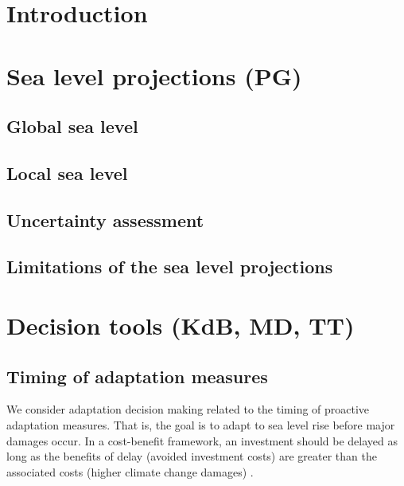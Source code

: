 \documentclass[wrr, draft]{agutex}
\begin{document}
\begin{article}



\section{Introduction}\label{sec:intro}

\section{Sea level projections {\color{blue} (PG)}}



\subsection{Global sea level}

\subsection{Local sea level}

\subsection{Uncertainty assessment}


\subsection{Limitations of the sea level projections}

\section{Decision tools {\color{blue} (KdB, MD, TT)}}

\subsection{Timing of adaptation measures}

We consider adaptation decision making related to the timing of proactive adaptation measures. That is, the goal is to adapt to sea level rise before major damages occur. In a cost-benefit framework, an investment should be delayed as long as the benefits of delay (avoided investment costs) are greater than the associated costs (higher climate change damages) \citep{Fankhauser&1999}.


\end{article}
\end{document}
